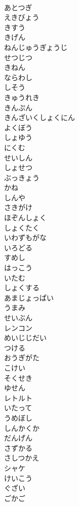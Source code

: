 \documentclass[8pt]{extreport}
\begin{document}
\begin{CJK}{UTF8}{min}
\\	あとつぎ
\\	えきびょう
\\	きすう
\\	きげん
\\	ねんじゅうぎょうじ
\\	せつじつ
\\	きねん
\\	ならわし
\\	しそう
\\	きゅうれき
\\	きんぷん
\\	きんざいくしょくにん
\\	よくぼう
\\	しょゆう
\\	にくむ
\\	せいしん
\\	しょせつ
\\	ぶっきょう
\\	かね
\\	しんや
\\	さきがけ
\\	ほぞんしょく
\\	しょくたく
\\	いわずもがな
\\	いろどる
\\	すめし
\\	はっこう
\\	いたむ
\\	しょくする
\\	あまじょっぱい
\\	うまみ
\\	せいぶん
\\	レンコン
\\	めいじじだい
\\	つける
\\	おうぎがた
\\	こけい
\\	そくせき
\\	ゆせん
\\	レトルト
\\	いたって
\\	うめぼし
\\	しんかくか
\\	だんげん
\\	さずかる
\\	さしつかえ
\\	シャケ
\\	けいこう
\\	ぐざい
\\	ごかご

\end{CJK}
\end{document}

